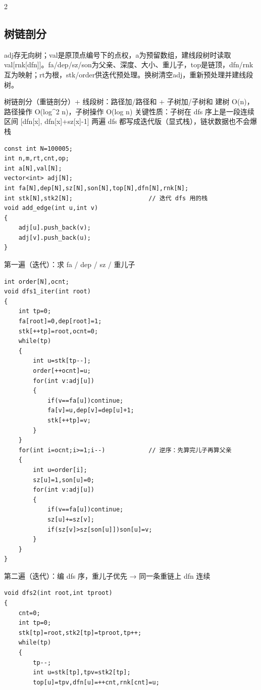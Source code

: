 \documentclass[UTF8,fontset=fandol,a4paper,twoside]{ctexart}
\newcommand{\note}[1]{{\fontsize{10}{12}\selectfont #1\par}}
\begin{document}
\begin{multicols}{2}
\subsection{树链剖分}

\note{adj存无向树；val是原顶点编号下的点权，a为预留数组，建线段树时读取val[\allowbreak{}rnk[\allowbreak{}dfn]\allowbreak{}]\allowbreak{}。fa/\allowbreak{}dep/\allowbreak{}sz/\allowbreak{}son为父亲、深度、大小、重儿子，top是链顶，dfn/\allowbreak{}rnk互为映射；rt为根，stk/\allowbreak{}order供迭代预处理。换树清空adj，重新预处理并建线段树。}
\note{树链剖分（重链剖分）+\allowbreak{} 线段树：路径加/\allowbreak{}路径和 +\allowbreak{} 子树加/\allowbreak{}子树和 建树 O(\allowbreak{}n)\allowbreak{}，路径操作 O(\allowbreak{}log\textasciicircum{}2 n)\allowbreak{}，子树操作 O(\allowbreak{}log n)\allowbreak{} 关键性质：子树在 dfs 序上是一段连续区间 [\allowbreak{}dfn[\allowbreak{}x]\allowbreak{},\allowbreak{} dfn[\allowbreak{}x]\allowbreak{}+\allowbreak{}sz[\allowbreak{}x]\allowbreak{}-\allowbreak{}1]\allowbreak{} 两遍 dfs 都写成迭代版（显式栈），链状数据也不会爆栈}
\begin{lstlisting}
const int N=100005;
int n,m,rt,cnt,op;
int a[N],val[N];
vector<int> adj[N];
int fa[N],dep[N],sz[N],son[N],top[N],dfn[N],rnk[N];
int stk[N],stk2[N];                     // 迭代 dfs 用的栈
void add_edge(int u,int v)
{
    adj[u].push_back(v);
    adj[v].push_back(u);
}
\end{lstlisting}
\note{第一遍（迭代）：求 fa /\allowbreak{} dep /\allowbreak{} sz /\allowbreak{} 重儿子}
\begin{lstlisting}
int order[N],ocnt;
void dfs1_iter(int root)
{
    int tp=0;
    fa[root]=0,dep[root]=1;
    stk[++tp]=root,ocnt=0;
    while(tp)
    {
        int u=stk[tp--];
        order[++ocnt]=u;
        for(int v:adj[u])
        {
            if(v==fa[u])continue;
            fa[v]=u,dep[v]=dep[u]+1;
            stk[++tp]=v;
        }
    }
    for(int i=ocnt;i>=1;i--)            // 逆序：先算完儿子再算父亲
    {
        int u=order[i];
        sz[u]=1,son[u]=0;
        for(int v:adj[u])
        {
            if(v==fa[u])continue;
            sz[u]+=sz[v];
            if(sz[v]>sz[son[u]])son[u]=v;
        }
    }
}
\end{lstlisting}
\note{第二遍（迭代）：编 dfs 序，重儿子优先 → 同一条重链上 dfn 连续}
\begin{lstlisting}
void dfs2(int root,int tproot)
{
    cnt=0;
    int tp=0;
    stk[tp]=root,stk2[tp]=tproot,tp++;
    while(tp)
    {
        tp--;
        int u=stk[tp],tpv=stk2[tp];
        top[u]=tpv,dfn[u]=++cnt,rnk[cnt]=u;

\end{lstlisting}
\end{multicols}
\end{document}
